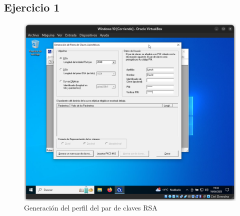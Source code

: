 \subsection{Ejercicio 1}
\graphicspath{ {img/1} }

\begin{figure}[h]
    \includegraphics[width=15cm]{ClavesRSA-01.png}
    \caption{Generación del perfil del par de claves RSA}
\end{figure}
